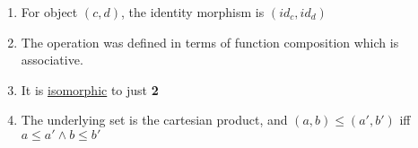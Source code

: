 \begin{enumerate}
    \item For object $(c,d)$, the identity morphism is $(id_c,id_d)$
    \item The operation was defined in terms of function composition which is associative.
    \item It is \hyperref[D3.28]{isomorphic} to just \textbf{2}
    \item The underlying set is the cartesian product, and $(a,b)\leq(a',b')$ iff $a \leq a' \land b \leq b'$
  \end{enumerate}
